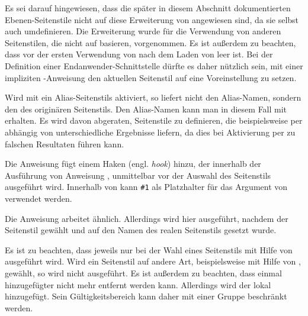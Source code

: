 Es sei darauf hingewiesen, dass die später in diesem Abschnitt dokumentierten
Ebenen-Seitenstile nicht auf diese Erweiterung von
 angewiesen sind, da sie selbst auch
 umdefinieren. Die Erweiterung wurde für die
Verwendung von anderen Seitenstilen, die nicht auf 
basieren, vorgenommen. Es ist außerdem zu beachten, dass
 vor der ersten Verwendung von
 nach dem Laden von  leer
ist. Bei der Definition einer Endanwender-Schnittstelle dürfte es daher
nützlich sein, mit einer impliziten -Anweisung
den aktuellen Seitenstil auf eine Voreinstellung zu setzen.%

Wird mit  ein Alias-Seitenstils aktiviert, so
liefert  nicht den Alias-Namen, sondern den des
originären Seitenstils. Den Alias-Namen
kann man in diesem Fall mit  erhalten. Es wird davon
abgeraten, Seitenstile zu definieren, die beispielsweise per
 abhängig von 
unterschiedliche Ergebnisse liefern, da dies bei Aktivierung per
 zu falschen Resultaten führen kann.%
\EndIndexGroup


\begin{Declaration}
\end{Declaration}
Die Anweisung  fügt einem Haken
(engl. \emph{hook})  hinzu, der innerhalb der Ausführung von
Anweisung %
, unmittelbar
vor der Auswahl des Seitenstils ausgeführt wird. Innerhalb von 
kann \texttt{\#1} als Platzhalter für das Argument von
 verwendet werden.

Die Anweisung  arbeitet ähnlich. Allerdings
wird hier  ausgeführt, nachdem der Seitenstil gewählt und
 auf den Namen des realen Seitenstils
gesetzt wurde.

Es ist zu beachten, dass  jeweils nur bei der
Wahl eines Seitenstils mit Hilfe von 
ausgeführt wird. Wird ein Seitenstil auf andere Art, beispielsweise mit Hilfe
von , gewählt, so wird  nicht
ausgeführt. Es ist außerdem zu beachten, dass einmal
hinzugefügter  nicht mehr entfernt werden kann. Allerdings wird
der  lokal hinzugefügt. Sein Gültigkeitsbereich kann daher mit
einer Gruppe beschränkt werden.%
\EndIndexGroup


